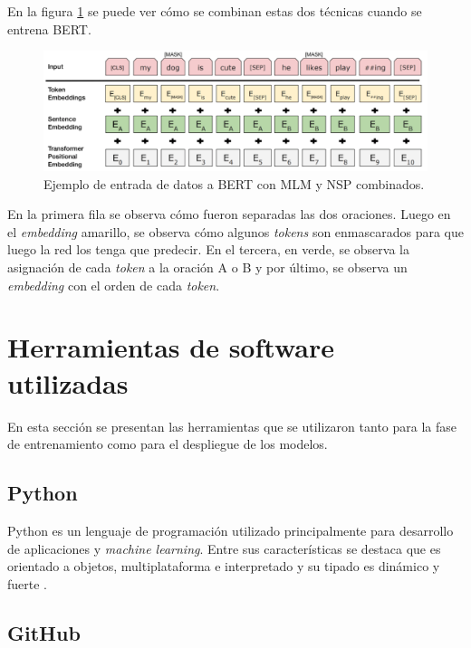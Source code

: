 En la figura \ref{fig:bertinput} se puede ver cómo se combinan estas dos técnicas cuando se entrena BERT.

\begin{figure}[htbp]
	\centering
	\includegraphics[width=.8\textwidth]{./Figures/bertinput.png}
	\caption{Ejemplo de entrada de datos a BERT con MLM y NSP combinados\protect\footnotemark.}
	\label{fig:bertinput}
\end{figure}


En la primera fila se observa cómo fueron separadas las dos oraciones. Luego en el \textit{embedding} amarillo, se observa cómo algunos \textit{tokens} son enmascarados para que luego la red los tenga que predecir. En el tercera, en verde, se observa la asignación de cada \textit{token} a la oración A o B y por último, se observa un \textit{embedding} con el orden de cada \textit{token}.

\section{Herramientas de software utilizadas}

En esta sección se presentan las herramientas que se utilizaron tanto para la fase de entrenamiento como para el despliegue de los modelos.

\subsection{Python}

Python es un lenguaje de programación utilizado principalmente para desarrollo de aplicaciones y \textit{machine learning}. Entre sus características se destaca que es orientado a objetos, multiplataforma e interpretado y su tipado es dinámico y fuerte \citep{WEBSITE:32}.

\subsection{GitHub}

